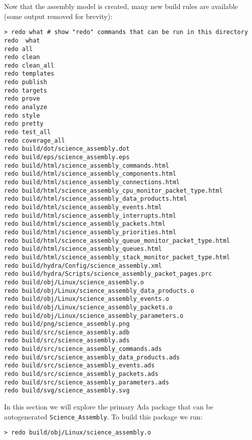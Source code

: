 Now that the assembly model is created, many new build rules are available (some output removed for brevity):

\vspace{5mm} %
\begin{verbatim}
> redo what # show "redo" commands that can be run in this directory
redo  what
redo all
redo clean
redo clean_all
redo templates
redo publish
redo targets
redo prove
redo analyze
redo style
redo pretty
redo test_all
redo coverage_all
redo build/dot/science_assembly.dot
redo build/eps/science_assembly.eps
redo build/html/science_assembly_commands.html
redo build/html/science_assembly_components.html
redo build/html/science_assembly_connections.html
redo build/html/science_assembly_cpu_monitor_packet_type.html
redo build/html/science_assembly_data_products.html
redo build/html/science_assembly_events.html
redo build/html/science_assembly_interrupts.html
redo build/html/science_assembly_packets.html
redo build/html/science_assembly_priorities.html
redo build/html/science_assembly_queue_monitor_packet_type.html
redo build/html/science_assembly_queues.html
redo build/html/science_assembly_stack_monitor_packet_type.html
redo build/hydra/Config/science_assembly.xml
redo build/hydra/Scripts/science_assembly_packet_pages.prc
redo build/obj/Linux/science_assembly.o
redo build/obj/Linux/science_assembly_data_products.o
redo build/obj/Linux/science_assembly_events.o
redo build/obj/Linux/science_assembly_packets.o
redo build/obj/Linux/science_assembly_parameters.o
redo build/png/science_assembly.png
redo build/src/science_assembly.adb
redo build/src/science_assembly.ads
redo build/src/science_assembly_commands.ads
redo build/src/science_assembly_data_products.ads
redo build/src/science_assembly_events.ads
redo build/src/science_assembly_packets.ads
redo build/src/science_assembly_parameters.ads
redo build/svg/science_assembly.svg
\end{verbatim}
\vspace{5mm} %

In this section we will explore the primary Ada package that can be autogenerated \texttt{Science\_Assembly}. To build this package we run:

\vspace{5mm} %
\begin{verbatim}
> redo build/obj/Linux/science_assembly.o
\end{verbatim}
\vspace{5mm} %

